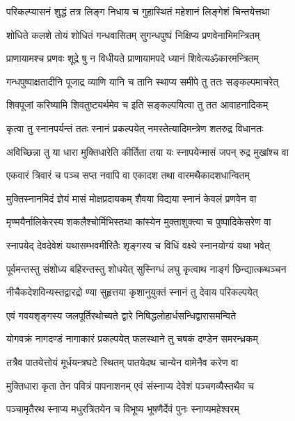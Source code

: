 \twolineshloka
{परिकल्प्यासनं शुद्धं तत्र लिङ्ग निधाय च}
{गुहास्थितं महेशानं लिङ्गेशं चिन्तयेत्तथा}%

\twolineshloka
{शोधिते कलशे तोयं शोधितं गन्धवासितम्}
{सुगन्धपुष्पं निक्षिप्य प्रणवेनाभिमन्त्रितम्}%

\twolineshloka
{प्राणायामश्च प्रणवः शूद्रे षु न विधीयते}
{प्राणायामपदे ध्यानं शिवेत्यॐकारमन्त्रितम्}%

\twolineshloka
{गन्धपुष्पाक्षतादीनि पूजाद्र व्याणि यानि च}
{तानि स्थाप्य समीपे तु ततः सङ्कल्पमाचरेत्}%

\twolineshloka
{शिवपूजां करिष्यामि शिवतुष्ट्यर्थमेव च}
{इति सङ्कल्पयित्वा तु तत आवाहनादिकम्}%

\twolineshloka
{कृत्वा तु स्नानपर्यन्तं ततः स्नानं प्रकल्पयेत्}
{नमस्तेत्यादिमन्त्रेण शतरुद्र विधानतः}%

\twolineshloka
{अविच्छिन्ना तु या धारा मुक्तिधारेति कीर्तिता}
{तया यः स्नापयेन्मासं जपन् रुद्र मुखांश्च वा}%

\twolineshloka
{एकवारं त्रिवारं च पञ्च सप्त नवापि वा}
{एकादश तथा वारमथैकादशधान्वितम्}%

\twolineshloka
{मुक्तिस्नानमिदं ज्ञेयं मासं मोक्षप्रदायकम्}
{शैवया विद्यया स्नानं केवलं प्रणवेन वा}%

\twolineshloka
{मृण्मयैर्नालिकेरस्य शकलैश्चोर्मिभिस्तथा}
{कांस्येन मुक्ताशुक्त्या च पुष्पादिकेसरेण वा}%

\twolineshloka
{स्नापयेद् देवदेवेशं यथासम्भवमीरितैः}
{शृङ्गस्य च विधिं वक्ष्ये स्नानयोग्यं यथा भवेत्}%

\twolineshloka
{पूर्वमन्तस्तु संशोध्य बहिरन्तस्तु शोधयेत्}
{सुस्निग्धं लघु कृत्वाथ नाङ्गं छिन्द्यात्कथञ्चन}%

\twolineshloka
{नीचैकदेशविन्यस्तद्वारद्रो ण्या सुहृत्तया}
{कृशानुयुक्तं स्नानं तु देवाय परिकल्पयेत्}%

\twolineshloka
{एवं गवयशृङ्गस्य जलपूर्तिरथोच्यते}
{द्वारे निषिद्धलोहार्धसन्धिद्वारासमन्विते}%

\twolineshloka
{योगवक्रं नागदण्डं नागाकारं प्रकल्पयेत्}
{फलस्थाने तु चषकं दण्डेन समरन्ध्रकम्}%

\twolineshloka
{तत्रैव पातयेत्तोयं मूर्धयन्त्रघटे स्थितम्}
{पातयेदथ चान्येन वामेनैव करेण वा}%

\twolineshloka
{मुक्तिधारा कृता तेन पवित्रं पापनाशनम्}
{एवं संस्नाप्य देवेशं पञ्चगव्यैस्तथैव च}%

\twolineshloka
{पञ्चामृतैरथ स्नाप्य मधुरत्रितयेन च}
{विभूष्य भूषणैर्देवं पुनः स्नाप्यमहेश्वरम्}%

